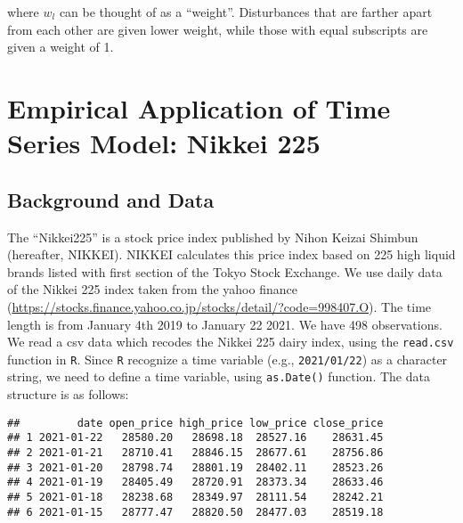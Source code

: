 \documentclass[
  12pt,
]{article}
\newenvironment{Shaded}{\begin{snugshade}}{\end{snugshade}}
\newcommand{\DataTypeTok}[1]{\textcolor[rgb]{0.13,0.29,0.53}{#1}}
\newcommand{\KeywordTok}[1]{\textcolor[rgb]{0.13,0.29,0.53}{\textbf{#1}}}
\newcommand{\NormalTok}[1]{#1}
\newcommand{\OperatorTok}[1]{\textcolor[rgb]{0.81,0.36,0.00}{\textbf{#1}}}
\newcommand{\OtherTok}[1]{\textcolor[rgb]{0.56,0.35,0.01}{#1}}
\newcommand{\StringTok}[1]{\textcolor[rgb]{0.31,0.60,0.02}{#1}}
\begin{document}
where \(w_l\) can be thought of as a ``weight''. Disturbances that are farther apart from each other are given lower weight, while those with equal subscripts are given a weight of 1.

\hypertarget{empirical-application-of-time-series-model-nikkei-225}{%
\section{Empirical Application of Time Series Model: Nikkei 225}\label{empirical-application-of-time-series-model-nikkei-225}}

\hypertarget{background-and-data-8}{%
\subsection{Background and Data}\label{background-and-data-8}}

The ``Nikkei225'' is a stock price index published by Nihon Keizai Shimbun (hereafter, NIKKEI).
NIKKEI calculates this price index based on 225 high liquid brands listed with first section of the Tokyo Stock Exchange.
We use daily data of the Nikkei 225 index taken from the yahoo finance
(\url{https://stocks.finance.yahoo.co.jp/stocks/detail/?code=998407.O}).
The time length is from January 4th 2019 to January 22 2021.
We have 498 observations.
We read a csv data which recodes the Nikkei 225 dairy index, using the \texttt{read.csv} function in \texttt{R}.
Since \texttt{R} recognize a time variable (e.g., \texttt{2021/01/22}) as a character string,
we need to define a time variable, using \texttt{as.Date()} function.
The data structure is as follows:

\begin{Shaded}
\end{Shaded}

\begin{verbatim}
##         date open_price high_price low_price close_price
## 1 2021-01-22   28580.20   28698.18  28527.16    28631.45
## 2 2021-01-21   28710.41   28846.15  28677.61    28756.86
## 3 2021-01-20   28798.74   28801.19  28402.11    28523.26
## 4 2021-01-19   28405.49   28720.91  28373.34    28633.46
## 5 2021-01-18   28238.68   28349.97  28111.54    28242.21
## 6 2021-01-15   28777.47   28820.50  28477.03    28519.18
\end{verbatim}
\end{document}
